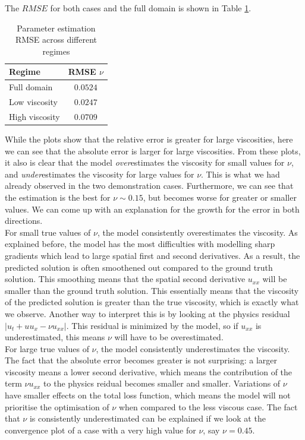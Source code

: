 \documentclass[we,twoside,openright,a4paper,11pt]{uantwerpenbamathesis}
\begin{document}
The $RMSE$ for both cases and the full domain is shown in Table \ref{tab:RMSE_BE}.

\begin{table}[H]
\centering
\caption{Parameter estimation RMSE across different regimes}\label{tab:RMSE_BE}
\begin{tabular}{lc}
\toprule
\textbf{Regime} & \textbf{RMSE $\nu$}\\
\midrule
Full domain         & $0.0524$ \\
Low viscosity       & $0.0247$\\
High viscosity      & $0.0709$\\
\bottomrule
\end{tabular}
\end{table}

While the plots show that the relative error is greater for large viscosities, here we can see that the absolute error is larger for large viscosities. From these plots, it also is clear that the model \textit{over}estimates the viscosity for small values for $\nu$, and \textit{under}estimates the viscosity for large values for $\nu$. This is what we had already observed in the two demonstration cases. Furthermore, we can see that the estimation is the best for $\nu\sim0.15$, but becomes worse for greater or smaller values. We can come up with an explanation for the growth for the error in both directions.\\

For small true values of $\nu$, the model consistently overestimates the viscosity. As explained before, the model has the most difficulties with modelling sharp gradients which lead to large spatial first and second derivatives. As a result, the predicted solution is often smoothened out compared to the ground truth solution. This smoothing means that the spatial second derivative $u_{xx}$ will be smaller than the ground truth solution. This essentially means that the viscosity of the predicted solution is greater than the true viscosity, which is exactly what we observe. Another way to interpret this is by looking at the physics residual $|u_t + uu_x -\nu u_{xx}|$. This residual is minimized by the model, so if $u_{xx}$ is underestimated, this means $\nu$ will have to be overestimated.\\

For large true values of $\nu$, the model consistently underestimates the viscosity. The fact that the absolute error becomes greater is not surprising: a larger viscosity means a lower second derivative, which means the contribution of the term $\nu u_{xx}$ to the physics reidual becomes smaller and smaller. Variations of $\nu$ have smaller effects on the total loss function, which means the model will not prioritise the optimisation of $\nu$ when compared to the less viscous case. The fact that $\nu$ is consistently underestimated can be explained if we look at the convergence plot of a case with a very high value for $\nu$, say $\nu=0.45$.
\end{document}
